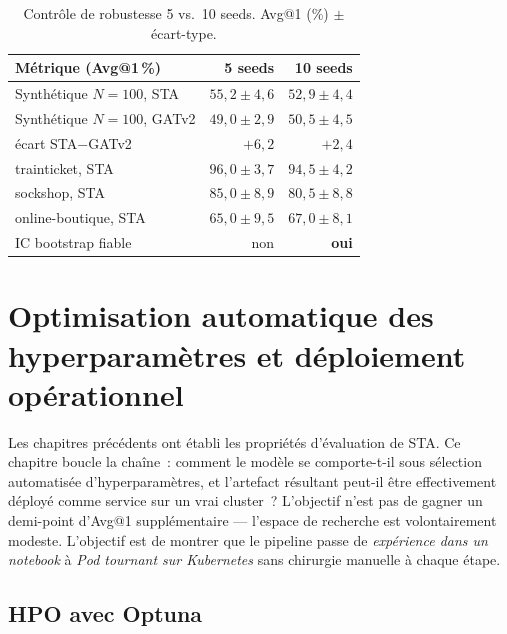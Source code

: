 \documentclass[a4paper,11pt,oneside]{report}
\begin{document}
\begin{table}[ht]
\centering
\caption{Contr\^ole de robustesse 5 vs.\ 10 seeds. Avg@1 (\%) $\pm$ \'ecart-type.}
\label{tab:robustesse}
\begin{tabular}{lrr}
\toprule
M\'etrique (Avg@1\,\%) & 5 seeds & 10 seeds \\
\midrule
Synth\'etique $N{=}100$, STA   & $55{,}2 \pm 4{,}6$ & $52{,}9 \pm 4{,}4$ \\
Synth\'etique $N{=}100$, GATv2 & $49{,}0 \pm 2{,}9$ & $50{,}5 \pm 4{,}5$ \\
\quad \'ecart STA$-$GATv2       & $+6{,}2$           & $+2{,}4$ \\
trainticket, STA               & $96{,}0 \pm 3{,}7$ & $94{,}5 \pm 4{,}2$ \\
sockshop, STA                  & $85{,}0 \pm 8{,}9$ & $80{,}5 \pm 8{,}8$ \\
online-boutique, STA           & $65{,}0 \pm 9{,}5$ & $67{,}0 \pm 8{,}1$ \\
\midrule
IC bootstrap fiable            & non                & \textbf{oui} \\
\bottomrule
\end{tabular}
\end{table}

\chapter{Optimisation automatique des hyperparam\`etres et d\'eploiement op\'erationnel}
\label{chap:hpo-deploiement}

Les chapitres pr\'ec\'edents ont \'etabli les propri\'et\'es d'\'evaluation de STA. Ce chapitre boucle la cha\^ine~: comment le mod\`ele se comporte-t-il sous s\'election automatis\'ee d'hyperparam\`etres, et l'artefact r\'esultant peut-il \^etre effectivement d\'eploy\'e comme service sur un vrai cluster~? L'objectif n'est pas de gagner un demi-point d'Avg@1 suppl\'ementaire --- l'espace de recherche est volontairement modeste. L'objectif est de montrer que le pipeline passe de \emph{exp\'erience dans un notebook} \`a \emph{Pod tournant sur Kubernetes} sans chirurgie manuelle \`a chaque \'etape.

\section{HPO avec Optuna}
\label{sec:hpo}
\end{document}
